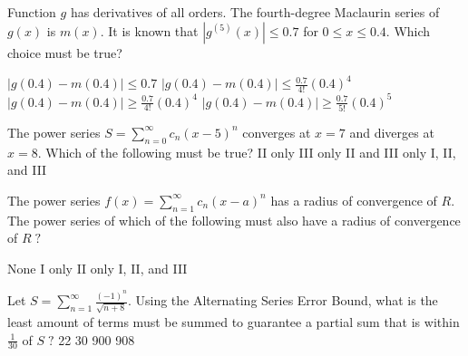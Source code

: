 \clearpage 

\begin{question}
Function \(g\) has derivatives of all orders. The fourth-degree Maclaurin series of \(g(x)\) is \(m(x).\) It is known that \(|g^{(5)}(x)| \leqslant 0.7\) for \(0 \leqslant x \leqslant 0.4.\) Which choice must be true?

\choices
{\(\left| g(0.4) - m(0.4) \right| \leqslant 0.7\)}
{\(\left| g(0.4) - m(0.4) \right| \leqslant \frac{0.7}{4!} (0.4)^4\)}
{\(\left| g(0.4) - m(0.4) \right| \geqslant \frac{0.7}{4!} (0.4)^4\)}
{\(\left| g(0.4) - m(0.4) \right| \geqslant \frac{0.7}{5!} (0.4)^5\)}
{}
\end{question}

\begin{question}
The power series \(S = \sum_{n = 0}^\infty c_n (x - 5)^n\) converges at \(x = 7\) and diverges at \(x = 8.\) Which of the following must be true?
\choices
{}
{II only}
{III only}
{II and III only}
{I, II, and III}
\end{question}

\begin{question}
The power series \(f(x) = \sum_{n = 1}^\infty c_n (x - a)^n\) has a radius of convergence of \(R.\) The power series of which of the following must also have a radius of convergence of \(R \; ?\)

\choices
{None}
{I only}
{II only}
{}
{I, II, and III}
\end{question}

\begin{question}
Let \(S = \sum_{n = 1}^\infty \frac{(-1)^n}{\sqrt{n + 8}}.\) Using the Alternating Series Error Bound, what is the least amount of terms must be summed to guarantee a partial sum that is within \(\frac{1}{30}\) of \(S \; ?\)
\choicesline
{22}
{30}
{}
{900}
{908}
\end{question}

\clearpage 

